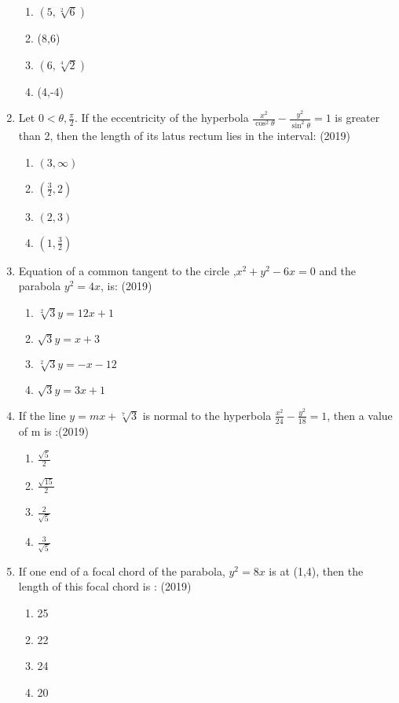 \documentclass[12pt]{article}
\begin{document}
\begin{enumerate}
\begin{enumerate}
\item $(5,\sqrt[2]{6})$
\item (8,6)
\item $(6,\sqrt[4]{2})$
\item (4,-4)
\end{enumerate}
\item Let $0<\theta, \frac{\pi}{2}$. If the eccentricity of the hyperbola $\frac{x^2}{\cos^2\theta}-\frac{y^2}{\sin^2\theta}=1$ is greater than 2, then the length of its
latus rectum lies in the interval: (2019)
\begin{enumerate}
\item $(3,\infty)$
\item $(\frac{3}{2},2)$
\item $(2,3)$
\item $(1,\frac{3}{2})$
\end{enumerate}
\item Equation of a common tangent to the circle ,$x^2+y^2-6x=0$ and the parabola $y^2=4x$, is: (2019)
\begin{enumerate}
\item $\sqrt[2]{3}y=12x+1$
\item $\sqrt{3}y=x+3$
\item $\sqrt[2]{3}y=-x-12$
\item $\sqrt{3}y=3x+1$
\end{enumerate} 
\item If the line $y=mx+\sqrt[7]{3}$ is normal to the hyperbola $\frac{x^2}{24}-\frac{y^2}{18}=1$, then a value of m is :(2019)
\begin{enumerate}
\item $\frac{\sqrt{5}}{2}$
\item $\frac{\sqrt{15}}{2}$
\item $\frac{2}{\sqrt{5}}$
\item $\frac{3}{\sqrt{5}}$
\end{enumerate}
\item If one end of a focal chord of the parabola, $y^2=8x$ is at (1,4), then the length of this focal chord is : (2019)
\begin{enumerate}
\item 25
\item 22
\item 24
\item 20
\end{enumerate}
\end{enumerate}
\end{document}
